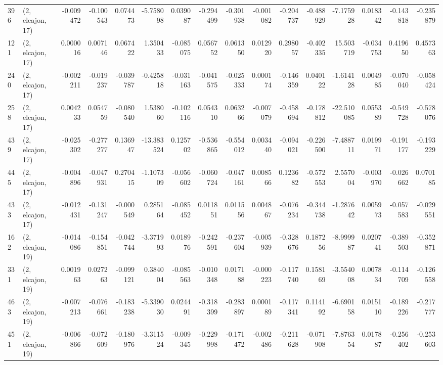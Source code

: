\begin{tabular}{llrrrrrrrrrrrrrr}
396 &  (2, elcajon, 17) &  -0.009472 & -0.100543 &  0.074473 &   -5.758098 &  0.039087 &  -0.294499 & -0.301938 & -0.001082 & -0.204737 & -0.488929 &   -7.175928 &  0.018342 & -0.143818 & -0.235879 \\
121 &  (2, elcajon, 17) &   0.000016 &  0.007146 &  0.067422 &    1.350433 & -0.085075 &   0.056752 &  0.061350 &  0.012920 &  0.298057 & -0.402335 &   15.503719 & -0.034753 &  0.419650 &  0.457363 \\
240 &  (2, elcajon, 17) &  -0.002211 & -0.019237 & -0.039787 &   -0.425818 & -0.031163 &  -0.041575 & -0.025333 &  0.000174 & -0.146359 &  0.040122 &   -1.614128 &  0.004985 & -0.070040 & -0.058424 \\
258 &  (2, elcajon, 17) &   0.004233 &  0.054759 & -0.080540 &    1.538060 & -0.102116 &   0.054310 &  0.063266 & -0.007079 & -0.458694 & -0.178812 &  -22.510085 &  0.055389 & -0.549728 & -0.578076 \\
439 &  (2, elcajon, 17) &  -0.025302 & -0.277277 &  0.136947 &  -13.383524 &  0.125702 &  -0.536865 & -0.554012 &  0.003440 & -0.094021 & -0.226500 &   -7.488711 &  0.019971 & -0.191177 & -0.193229 \\
445 &  (2, elcajon, 17) &  -0.004896 & -0.047931 &  0.270415 &   -1.107309 & -0.056602 &  -0.060724 & -0.047161 &  0.008566 &  0.123682 & -0.572553 &    2.557004 & -0.003970 & -0.026662 &  0.070185 \\
433 &  (2, elcajon, 17) &  -0.012431 & -0.131247 & -0.000549 &    0.285164 & -0.085452 &   0.011851 &  0.011556 &  0.004867 & -0.076234 & -0.344738 &   -1.287642 &  0.005973 & -0.057583 & -0.029551 \\
162 &  (2, elcajon, 19) &  -0.014086 & -0.154851 & -0.042744 &   -3.371993 &  0.018976 &  -0.242591 & -0.237604 & -0.005939 & -0.328676 &  0.187256 &   -8.999987 &  0.020741 & -0.389503 & -0.352871 \\
331 &  (2, elcajon, 19) &   0.001963 &  0.027263 & -0.099121 &    0.384004 & -0.085563 &  -0.010348 &  0.017188 & -0.000223 & -0.117740 &  0.158169 &   -3.554008 &  0.007834 & -0.114709 & -0.126558 \\
463 &  (2, elcajon, 19) &  -0.007213 & -0.076661 & -0.183238 &   -5.339030 &  0.024491 &  -0.318399 & -0.283897 &  0.000189 & -0.117341 &  0.114192 &   -6.690158 &  0.015110 & -0.189226 & -0.217777 \\
451 &  (2, elcajon, 19) &  -0.006866 & -0.072609 & -0.180976 &   -3.311524 & -0.009345 &  -0.229998 & -0.171472 & -0.002486 & -0.211628 & -0.071908 &   -7.876354 &  0.017887 & -0.256402 & -0.253603 \\

\end{tabular}
